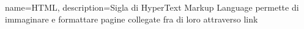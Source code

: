 {
	name={HTML},
	description={Sigla di HyperText Markup Language permette di immaginare e formattare pagine collegate fra di loro attraverso link}
}